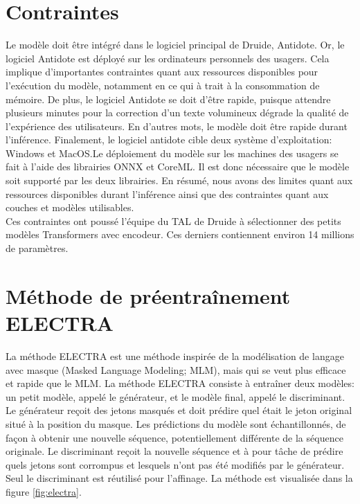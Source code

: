\documentclass[12pt,twoside,maitrise]{dms}
\theoremstyle{definition}
\numberwithin{equation}{section}
\numberwithin{table}{chapter}
\numberwithin{figure}{chapter}
\begin{document}
\section{Contraintes}
Le modèle doit être intégré dans le logiciel principal de Druide, Antidote. Or,
le logiciel Antidote est déployé sur les ordinateurs personnels des usagers.
Cela implique d'importantes contraintes quant aux ressources disponibles pour
l'exécution du modèle, notamment en ce qui à trait à la consommation de
mémoire. De plus, le logiciel Antidote se doit d'être rapide, puisque attendre
plusieurs minutes pour la correction d'un texte volumineux dégrade la qualité
de l'expérience des utilisateurs. En d'autres mots, le modèle doit être rapide
durant l'inférence. Finalement, le logiciel antidote cible deux système
d'exploitation: Windows et MacOS.\@ Le déploiement du modèle sur les machines
des usagers se fait à l'aide des librairies ONNX\cite{onnxruntime} et CoreML.\@
Il est donc nécessaire que le modèle soit supporté par les deux librairies.
En résumé, nous avons des limites quant aux ressources disponibles durant
l'inférence ainsi que des contraintes quant aux couches et modèles utilisables.\\

Ces contraintes ont poussé l'équipe du TAL de Druide à sélectionner
des petits modèles Transformers\cite{vaswani2023attentionneed} avec
encodeur. Ces derniers contiennent environ 14 millions de paramètres.

\section{Méthode de préentraînement ELECTRA}

La méthode ELECTRA\cite{clark2020electrapretrainingtextencoders} est une
méthode inspirée de la modélisation de langage avec masque (Masked Language
Modeling; MLM), mais qui se veut plus efficace et rapide que le MLM. La méthode
ELECTRA consiste à entraîner deux modèles: un petit modèle, appelé le
générateur, et le modèle final, appelé le discriminant. Le générateur reçoit
des jetons masqués et doit prédire quel était le jeton original situé à la
position du masque. Les prédictions du modèle sont échantillonnés, de façon à
obtenir une nouvelle séquence, potentiellement différente de la séquence
originale. Le discriminant reçoit la nouvelle séquence et à pour tâche de
prédire quels jetons sont corrompus et lesquels n'ont pas été modifiés par le
générateur. Seul le discriminant est réutilisé pour l'affinage. La méthode est
visualisée dans la figure \ref{fig:electra}.
\end{document}
